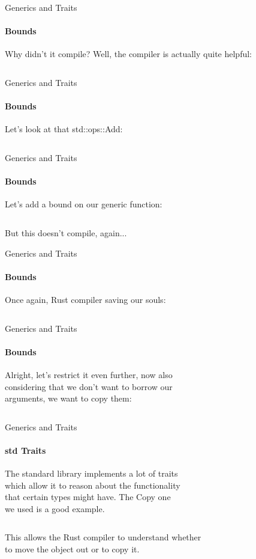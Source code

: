 \documentclass[usenames,dvipsnames,10pt,aspectratio=169]{beamer}
\begin{document}
\begin{frame}{Generics and Traits}
	\framesubtitle{Bounds}
	Why didn't it compile? Well, the compiler is actually quite helpful:\\
	\vspace{0.2cm}
	\inputminted[fontsize=\large]{rust}{code/generics6.rs}
\end{frame}

\begin{frame}{Generics and Traits}
	\framesubtitle{Bounds}
	\large
	Let's look at that \textcolor{ucuyellow}{std::ops::Add}:
	\vspace{0.2cm}
	\inputminted[fontsize=\large]{rust}{code/generics7.rs}
\end{frame}

\begin{frame}{Generics and Traits}
	\framesubtitle{Bounds}
	\large
	Let's add a bound on our generic function:\\
	\vspace{0.2cm}
	\inputminted[fontsize=\large]{rust}{code/generics8.rs}
	\vspace{0.6cm}
	But this doesn't compile, again...
\end{frame}

\begin{frame}{Generics and Traits}
	\framesubtitle{Bounds}
	\large
	Once again, Rust compiler saving our souls:
	\vspace{0.2cm}
	\inputminted[fontsize=\normalsize]{rust}{code/generics9.rs}
\end{frame}

\begin{frame}{Generics and Traits}
	\framesubtitle{Bounds}
	\large
	Alright, let's restrict it even further, now also\\
	considering that we don't want to borrow our\\
	arguments, we want to copy them:\\
	\vspace{0.2cm}
	\inputminted[fontsize=\large]{rust}{code/generics10.rs}
\end{frame}

\begin{frame}{Generics and Traits}
	\framesubtitle{std Traits}
	\large
	The standard library implements a lot of traits\\
	which allow it to reason about the functionality\\
	that certain types might have. The \textcolor{ucuyellow}{Copy} one\\
	we used	is a good example.\\
	\vspace{0.2cm}
	\inputminted[fontsize=\large]{rust}{code/traits6.rs}
	\vspace{0.2cm}
	This allows the Rust compiler to understand whether\\
	to move the object out or to copy it. 	
\end{frame}
\end{document}
